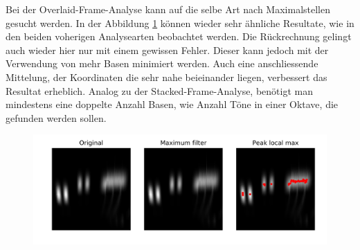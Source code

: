Bei der Overlaid-Frame-Analyse kann auf die selbe Art nach Maximalstellen gesucht werden. In der Abbildung \ref{fig:overlaid_max} können wieder sehr ähnliche Resultate, wie in den beiden voherigen Analysearten beobachtet werden. Die Rückrechnung gelingt auch wieder hier nur mit einem gewissen Fehler. Dieser kann jedoch mit der Verwendung von mehr Basen minimiert werden.  Auch eine anschliessende Mittelung, der Koordinaten die sehr nahe beieinander liegen, verbessert das Resultat erheblich. Analog zu der Stacked-Frame-Analyse, benötigt man mindestens eine doppelte Anzahl Basen, wie Anzahl Töne in einer Oktave, die gefunden werden sollen.
\begin{figure}[!ht]
	\centering
	\includegraphics[width=\linewidth]{papers/autotune/sections/frames/images/Overlaid/dwtmaxima.jpg}
	\label{fig:overlaid_max}
\end{figure}%

